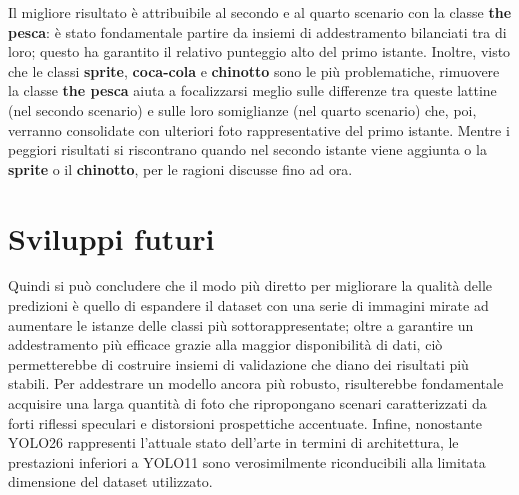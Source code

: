 \documentclass[../main.tex]{subfiles}
\begin{document}
\vspace{\baselineskip}
\noindent
Il migliore risultato è attribuibile al secondo e al quarto scenario con la classe \textbf{the pesca}: è stato fondamentale partire da insiemi di addestramento bilanciati tra di loro; questo ha garantito il relativo punteggio alto del primo istante. Inoltre, visto che le classi \textbf{sprite}, \textbf{coca-cola} e \textbf{chinotto} sono le più problematiche, rimuovere la classe \textbf{the pesca} aiuta a focalizzarsi meglio sulle differenze tra queste lattine (nel secondo scenario) e sulle loro somiglianze (nel quarto scenario) che, poi, verranno consolidate con ulteriori foto rappresentative del primo istante.
\noindent
Mentre i peggiori risultati si riscontrano quando nel secondo istante viene aggiunta o la \textbf{sprite} o il \textbf{chinotto}, per le ragioni discusse fino ad ora.

\section{Sviluppi futuri}
Quindi si può concludere che il modo più diretto per migliorare la qualità delle predizioni è quello di espandere il dataset con una serie di immagini mirate ad aumentare le istanze delle classi più sottorappresentate; oltre a garantire un addestramento più efficace grazie alla maggior disponibilità di dati, ciò permetterebbe di costruire insiemi di validazione che diano dei risultati più stabili.
Per addestrare un modello ancora più robusto, risulterebbe fondamentale acquisire una larga quantità di foto che ripropongano scenari caratterizzati da forti riflessi speculari e distorsioni prospettiche accentuate. Infine, nonostante YOLO26 rappresenti l'attuale stato dell'arte in termini di architettura, le prestazioni inferiori a YOLO11 sono verosimilmente riconducibili alla limitata dimensione del dataset utilizzato.
\end{document}
